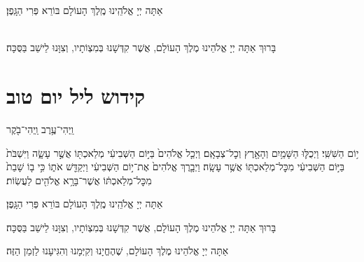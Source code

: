 \savri
{}
אַתָּה יְיָ אֱלֹהֵֽינוּ מֶֽלֶךְ הָעוֹלָם בּוֹרֵא פְּרִי הַגָּֽפֶן׃

\kiddushshabbateve

\begin{sometimes}

\\
בָּרוּךְ אַתָּה יְיָ אֱלֹהֵינוּ מֶלֶךְ הָעוֹלָם, אֲשֶׁר קִדְּשָׁנוּ בְּמִצְוֹתָיו, וְצִוָּנוּ לֵישֵׁב בַּסֻּכָּה׃

\end{sometimes}

\chapter[קידוש ליל יום טוב]{ קידוש ליל יום טוב }
\label{kiddush leil yom tov}
\begin{footnotesize}וַֽיְהִי־עֶ֥רֶב וַֽיְהִי־בֹ֖קֶר\end{footnotesize}
י֥וֹם הַשִּׁשִּֽׁי׃ וַיְכֻלּ֛וּ הַשָּׁמַ֥יִם וְהָאָ֖רֶץ וְכׇל־צְבָאָֽם׃ וַיְכַ֤ל אֱלֹהִים֙ בַּיּ֣וֹם הַשְּׁבִיעִ֔י מְלַאכְתּ֖וֹ אֲשֶׁ֣ר עָשָׂ֑ה וַיִּשְׁבֹּת֙ בַּיּ֣וֹם הַשְּׁבִיעִ֔י מִכׇּל־מְלַאכְתּ֖וֹ אֲשֶׁ֥ר עָשָֽׂה׃ וַיְבָ֤רֶךְ אֱלֹהִים֙ אֶת־י֣וֹם הַשְּׁבִיעִ֔י וַיְקַדֵּ֖שׁ אֹת֑וֹ כִּ֣י ב֤וֹ שָׁבַת֙ מִכׇּל־מְלַאכְתּ֔וֹ אֲשֶׁר־בָּרָ֥א אֱלֹהִ֖ים לַעֲשֽׂוֹת׃

\sepline


\savri
{}
אַתָּה יְיָ אֱלֹהֵֽינוּ מֶֽלֶךְ הָעוֹלָם בּוֹרֵא פְּרִי הַגָּֽפֶן׃


\kiddushYTeve



\vspace{-.5\baselineskip}
בָּרוּךְ אַתָּה יְיָ אֱלֹהֵינוּ מֶלֶךְ הָעוֹלָם, אֲשֶׁר קִדְּשָׁנוּ בְּמִצְוֹתָיו, וְצִוָּנוּ לֵישֵׁב בַּסֻּכָּה׃

אַתָּה יְיָ אֱלֹהֵינוּ מֶלֶךְ הָעוֹלָם, שֶׁהֶחֱיָנוּ וְקִיְּמָנוּ וְהִגִּיעָנוּ לַזְמַן הַזֶּה׃


